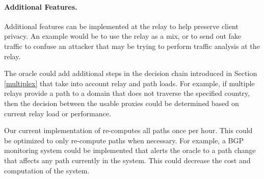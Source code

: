 \paragraph{Additional \system{} Features.}  Additional features can be 
implemented at the relay to help preserve client privacy.  An example would 
be to use the relay as a mix, or to send out fake traffic to confuse an 
attacker that may be trying to perform traffic analysis at the relay.

The oracle could add additional 
steps in the decision chain introduced in Section \ref{multiplex} that take 
into account relay and path loads.  For example, if multiple relays provide 
a path to a domain that does not traverse the specified country, then the 
decision between the usable proxies could be determined based on current relay 
load or performance. 

Our current implementation of \system{} 
re-computes all paths once per hour.  This could be optimized to only re-compute 
paths when necessary.  For example, a BGP monitoring system could be implemented 
that alerts the oracle to a path change that affects any path currently in 
the system.  This could decrease the cost and computation of the system.
